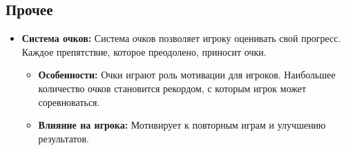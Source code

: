 \documentclass{article}
\begin{document}
\subsection{Прочее}
\begin{itemize}
    \item \textbf{Система очков:} Система очков позволяет игроку оценивать свой прогресс. Каждое препятствие, которое преодолено, приносит очки.
    \begin{itemize}
        \item \textbf{Особенности:} Очки играют роль мотивации для игроков. Наибольшее количество очков становится рекордом, с которым игрок может соревноваться.
        \item \textbf{Влияние на игрока:} Мотивирует к повторным играм и улучшению результатов.
    \end{itemize}
\end{itemize}
\end{document}
